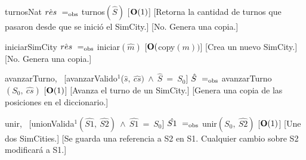\begin{Interfaz}
    \InterfazFuncion
    {turnos}{}{Nat}
    {$\hat{res}\ \igobs\ $turnos$(\hat{S})$}
    [$\bold{O}(1)$]
    [Retorna la cantidad de turnos que pasaron desde que se inició el SimCity.]
    [No. Genera una copia.]

    \InterfazFuncion
    {iniciar}{}{SimCity}
    {$\hat{res}\ \igobs\ $iniciar$(\hat{m})$}
    [$\bold{O}($copy$(m))$]
    [Crea un nuevo SimCity.]
    [No. Genera una copia.]

    \InterfazFuncion
    {avanzarTurno}{,\ }{}
    [avanzarValido$^{1}$($\hat{s},\ \hat{cs})\ \land\ \hat{S}\ =\ S_0$]
    {$\hat{S}\ \igobs\ $avanzarTurno$(S_0,\ \hat{cs})$}
    [$\bold{O}(1)$]
    [Avanza el turno de un SimCity.]
    [Genera una copia de las posiciones en el diccionario.]

    \InterfazFuncion
    {unir}{,\ }{}
    [unionValida$^{1}(\hat{S1},\ \hat{S2})\ \land\ \hat{S1}\ =\ S_0$]
    {$\hat{S1}\ \igobs\ $unir$(S_0,\ \hat{S2})$}
    [$\bold{O}(1)$]
    [Une dos SimCities.]
    [Se guarda una referencia a S2 en S1. Cualquier cambio sobre S2 modificará a S1.]

    \vfill{}
\end{Interfaz}